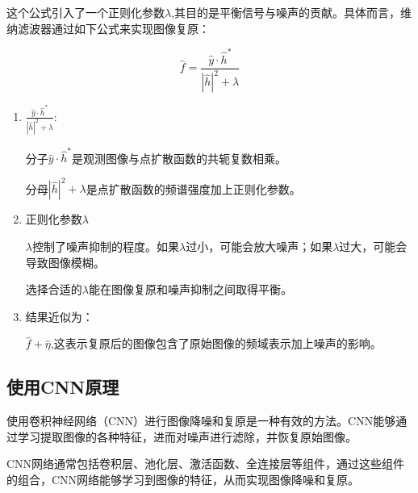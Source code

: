 \documentclass{lzureport}
\begin{document}
这个公式引入了一个正则化参数$\lambda$,其目的是平衡信号与噪声的贡献。具体而言，维纳滤波器通过如下公式来实现图像复原：

$$\hat{f}=\frac{\hat{y}\cdot\hat{h}^*}{|\hat{h}|^2+\lambda}$$

\begin{enumerate}[label=\arabic*)]
	\item $\frac {\hat{y} \cdot \hat{h} ^* }{| \hat{h} | ^2+ \lambda }:$

	分子$\hat{y}\cdot\hat{h}^*$是观测图像与点扩散函数的共轭复数相乘。
	
	分母$|\hat{h}|^2+\lambda$是点扩散函数的频谱强度加上正则化参数。
	\item 正则化参数$\lambda $

	$\lambda$控制了噪声抑制的程度。如果$\lambda$过小，可能会放大噪声；如果$\lambda$过大，可能会导致图像模糊。
	
	选择合适的$\lambda$能在图像复原和噪声抑制之间取得平衡。
	\item 结果近似为：
	
	$\hat{f}+\hat{\eta}$,这表示复原后的图像包含了原始图像的频域表示加上噪声的影响。
\end{enumerate}


\subsection{使用CNN原理}
使用卷积神经网络（CNN）进行图像降噪和复原是一种有效的方法。CNN能够通过学习提取图像的各种特征，进而对噪声进行滤除，并恢复原始图像。

CNN网络通常包括卷积层、池化层、激活函数、全连接层等组件，通过这些组件的组合，CNN网络能够学习到图像的特征，从而实现图像降噪和复原。
\end{document}
